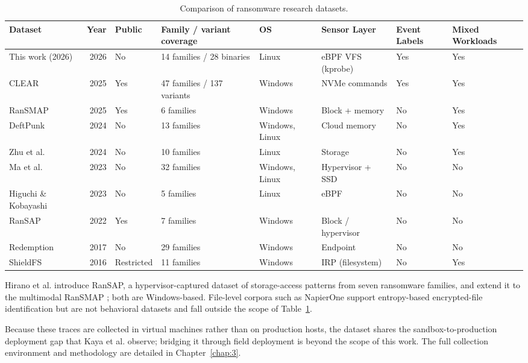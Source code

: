 \begin{table}[htbp]
\centering
\small
\caption{Comparison of ransomware research datasets.}\label{tab:2-2}
\begin{tabularx}{\textwidth}{lrlXllll}
\hline
\textbf{Dataset} & \textbf{Year} & \textbf{Public} & \textbf{Family /\allowbreak{} variant coverage} & \textbf{OS} & \textbf{Sensor Layer} & \textbf{Event Labels} & \textbf{Mixed Workloads} \\
\hline
This work (2026) & 2026 & No & 14 families /\allowbreak{} 28 binaries & Linux & eBPF VFS (kprobe) & Yes & Yes \\
CLEAR \cite{ref9} & 2025 & Yes & 47 families /\allowbreak{} 137 variants & Windows & NVMe commands & Yes & Yes \\
RanSMAP \cite{ref23} & 2025 & Yes & 6 families & Windows & Block + memory & No & Yes \\
DeftPunk \cite{ref34} & 2024 & No & 13 families & Windows, Linux & Cloud memory & No & Yes \\
Zhu et al. \cite{ref35} & 2024 & No & 10 families & Linux & Storage & No & Yes \\
Ma et al. \cite{ref36} & 2023 & No & 32 families & Windows, Linux & Hypervisor + SSD & No & No \\
Higuchi \& Kobayashi \cite{ref37} & 2023 & No & 5 families & Linux & eBPF & No & No \\
RanSAP \cite{ref22} & 2022 & Yes & 7 families & Windows & Block /\allowbreak{} hypervisor & No & No \\
Redemption \cite{ref38} & 2017 & No & 29 families & Windows & Endpoint & No & No \\
ShieldFS \cite{ref39} & 2016 & Restricted & 11 families & Windows & IRP (filesystem) & No & Yes \\
\hline
\end{tabularx}
\end{table}

Hirano et al. \cite{ref22} introduce RanSAP, a hypervisor-captured dataset of storage-access patterns from seven ransomware families, and extend it to the multimodal RanSMAP \cite{ref23}; both are Windows-based. File-level corpora such as NapierOne \cite{ref28} support entropy-based encrypted-file identification \cite{ref27} but are not behavioral datasets and fall outside the scope of Table~\ref{tab:2-2}.

Because these traces are collected in virtual machines rather than on production hosts, the dataset shares the sandbox-to-production deployment gap that Kaya et al. \cite{ref15} observe; bridging it through field deployment is beyond the scope of this work. The full collection environment and methodology are detailed in Chapter~\ref{chap:3}.

